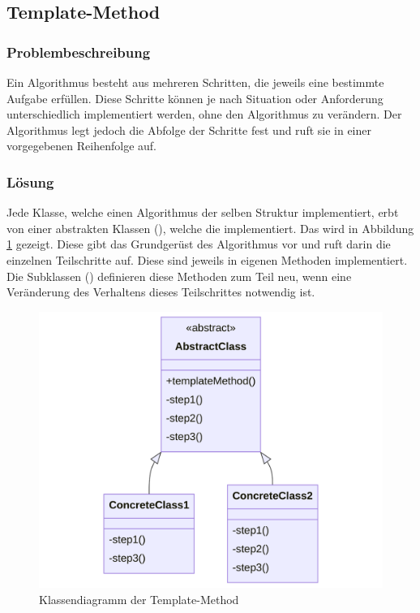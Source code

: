 \subsection{Template-Method}

\subsubsection*{Problembeschreibung}

Ein Algorithmus besteht aus mehreren Schritten, die jeweils eine bestimmte Aufgabe erfüllen. Diese Schritte können je nach Situation oder Anforderung unterschiedlich implementiert werden, ohne den Algorithmus zu verändern. Der Algorithmus legt jedoch die Abfolge der Schritte fest und ruft sie in einer vorgegebenen Reihenfolge auf. \cite{gamma_design_1995}

\subsubsection*{Lösung}

Jede Klasse, welche einen Algorithmus der selben Struktur implementiert, erbt von einer abstrakten Klassen (), welche die  implementiert. Das wird in Abbildung \ref{fig:template-method-class} gezeigt. Diese gibt das Grundgerüst des Algorithmus vor und ruft darin die einzelnen Teilschritte auf. Diese sind jeweils in eigenen Methoden implementiert. Die Subklassen () definieren diese Methoden zum Teil neu, wenn eine Veränderung des Verhaltens dieses Teilschrittes notwendig ist.

\begin{figure}[htb]
	\centering
	\includegraphics[width=0.75\linewidth]{images/patterns/template-method-class.png}
	\caption{Klassendiagramm der Template-Method \cite{skobeleva_template_2023}}
	\label{fig:template-method-class}
\end{figure}

